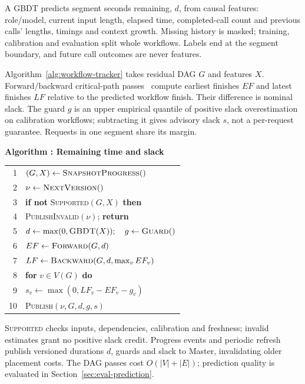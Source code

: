 A GBDT predicts segment seconds remaining, $d$, from causal features: role/model,
current input length, elapsed time, completed-call count and previous
calls' lengths, timings and context growth. Missing history is masked;
training, calibration and evaluation split whole workflows. Labels end
at the segment boundary, and future call outcomes are never features.

Algorithm~\ref{alg:workflow-tracker} takes residual DAG $G$ and features
$X$. Forward/backward critical-path passes~\cite{kelley1959cpm} compute
earliest finishes $EF$ and latest finishes $LF$ relative to the predicted
workflow finish. Their difference is nominal slack. The guard $g$ is an
upper empirical quantile of positive slack overestimation on calibration
workflows; subtracting it gives advisory slack $s$, not a per-request
guarantee. Requests in one segment share its margin.

\par\medskip\noindent\begin{minipage}{\columnwidth}
\raggedright
 \label{alg:workflow-tracker}
 \textbf{Algorithm \thedesignalgorithm: Remaining time and slack}
 \par\smallskip
 \begin{tabularx}{\columnwidth}{@{}r@{\quad}X@{}}
 \toprule
 1 & $(G,X)\gets\textsc{SnapshotProgress}()$ \\
 2 & $\nu\gets\textsc{NextVersion}()$ \\
 3 & \textbf{if not} \textsc{Supported}$(G,X)$ \textbf{then} \\
 4 & \quad \textsc{PublishInvalid}$(\nu)$; \textbf{return} \\
 5 & $d\gets\max(0,\textsc{GBDT}(X));\quad g\gets\textsc{Guard}()$ \\
 6 & $EF\gets\textsc{Forward}(G,d)$ \\
 7 & $LF\gets\textsc{Backward}(G,d,\max_v EF_v)$ \\
 8 & \textbf{for} $v\in V(G)$ \textbf{do} \\
 9 & \quad $s_v\gets\max(0,LF_v-EF_v-g_v)$ \\
 10 & \textsc{Publish}$(\nu,G,d,g,s)$ \\
 \bottomrule
 \end{tabularx}
\end{minipage}\par\medskip

\textsc{Supported} checks inputs, dependencies, calibration and freshness;
invalid estimates grant no positive slack credit. Progress events and
periodic refresh publish versioned durations $d$, guards and slack to
Master, invalidating older placement costs. The DAG passes cost
$O(|V|+|E|)$; prediction quality is evaluated in
Section~\ref{sec:eval-prediction}.

